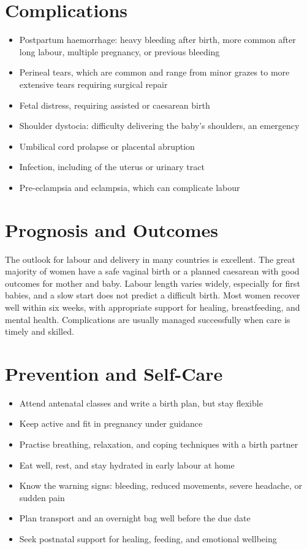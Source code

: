 \section*{Complications}
\begin{itemize}
    \item Postpartum haemorrhage: heavy bleeding after birth, more common after long labour, multiple pregnancy, or previous bleeding
    \item Perineal tears, which are common and range from minor grazes to more extensive tears requiring surgical repair
    \item Fetal distress, requiring assisted or caesarean birth
    \item Shoulder dystocia: difficulty delivering the baby's shoulders, an emergency
    \item Umbilical cord prolapse or placental abruption
    \item Infection, including of the uterus or urinary tract
    \item Pre-eclampsia and eclampsia, which can complicate labour
\end{itemize}

\section*{Prognosis and Outcomes}
The outlook for labour and delivery in many countries is excellent. The great majority of women have a safe vaginal birth or a planned caesarean with good outcomes for mother and baby. Labour length varies widely, especially for first babies, and a slow start does not predict a difficult birth. Most women recover well within six weeks, with appropriate support for healing, breastfeeding, and mental health. Complications are usually managed successfully when care is timely and skilled.

\section*{Prevention and Self-Care}
\begin{itemize}
    \item Attend antenatal classes and write a birth plan, but stay flexible
    \item Keep active and fit in pregnancy under guidance
    \item Practise breathing, relaxation, and coping techniques with a birth partner
    \item Eat well, rest, and stay hydrated in early labour at home
    \item Know the warning signs: bleeding, reduced movements, severe headache, or sudden pain
    \item Plan transport and an overnight bag well before the due date
    \item Seek postnatal support for healing, feeding, and emotional wellbeing
\end{itemize}

